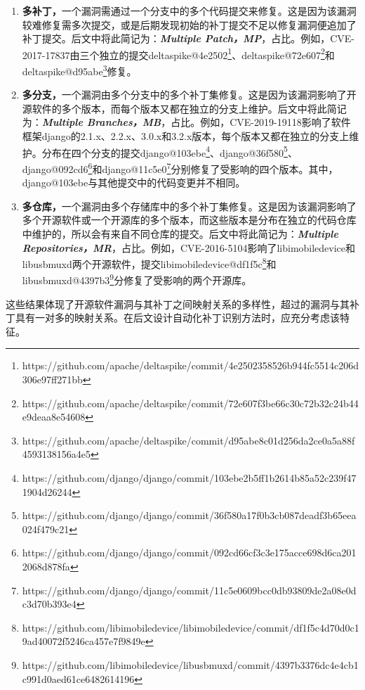 \begin{enumerate}
\item [（1）] \textbf{多补丁，}一个漏洞需通过一个分支中的多个代码提交来修复。这是因为该漏洞较难修复需多次提交，或是后期发现初始的补丁提交不足以修复漏洞便追加了补丁提交。后文中将此简记为：\textbf{\textit{Multiple Patch，MP}}，占比。例如，CVE-2017-17837由三个独立的提交deltaspike@4e2502\footnote{https://github.com/apache/deltaspike/commit/4e2502358526b944fc5514c206d306e97ff271bb}、deltaspike@72e607\footnote{https://github.com/apache/deltaspike/commit/72e607f3be66c30c72b32c24b44e9deaa8e54608}和\\deltaspike@d95abe\footnote{https://github.com/apache/deltaspike/commit/d95abe8c01d256da2ce0a5a88f4593138156a4e5}修复。
\item [（2）] \textbf{多分支，}一个漏洞由多个分支中的多个补丁集修复。这是因为该漏洞影响了开源软件的多个版本，而每个版本又都在独立的分支上维护。后文中将此简记为：\textbf{\textit{Multiple Branches，MB}}，占比。例如，CVE-2019-19118影响了软件框架django的2.1.x、2.2.x、3.0.x和3.2.x版本，每个版本又都在独立的分支上维护。分布在四个分支的提交django@103ebe\footnote{https://github.com/django/django/commit/103ebe2b5ff1b2614b85a52c239f471904d26244}、django@36f580\footnote{https://github.com/django/django/commit/36f580a17f0b3cb087deadf3b65eea024f479c21}、django@092cd6\footnote{https://github.com/django/django/commit/092cd66cf3c3e175acce698d6ca2012068d878fa}和django@11c5e0\footnote{https://github.com/django/django/commit/11c5e0609bcc0db93809de2a08e0dc3d70b393e4}分别修复了受影响的四个版本。其中，django@103ebe与其他提交中的代码变更并不相同。
\item [（3）] \textbf{多仓库，}一个漏洞由多个存储库中的多个补丁集修复。这是因为该漏洞影响了多个开源软件或一个开源库的多个版本，而这些版本是分布在独立的代码仓库中维护的，所以会有来自不同仓库的提交。后文中将此简记为：\textbf{\textit{Multiple Repositories，MR}}，占比。例如，CVE-2016-5104影响了libimobiledevice和libusbmuxd两个开源软件，提交libimobiledevice@df1f5c\footnote{https://github.com/libimobiledevice/libimobiledevice/commit/df1f5c4d70d0c19ad40072f5246ca457e7f9849e}和libusbmuxd@4397b3\footnote{https://github.com/libimobiledevice/libusbmuxd/commit/4397b3376dc4e4cb1c991d0aed61ce6482614196}分修复了受影响的两个开源库。

\end{enumerate}
这些结果体现了开源软件漏洞与其补丁之间映射关系的多样性，超过的漏洞与其补丁具有一对多的映射关系。在后文设计自动化补丁识别方法时，应充分考虑该特征。

